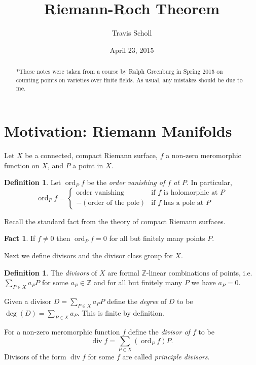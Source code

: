 \documentclass[11pt]{article}
\date{April 23, 2015}
\newcommand{\BB}[1]{\mathbb{#1}} %
\newcommand{\ZZ}{\BB{Z}}
\renewcommand{\div}{\operatorname{div}} %
\newcommand{\ord}{\operatorname{ord}}
\theoremstyle{plain}
\theoremstyle{definition}
\newtheorem{defn}[definitionCounter]{Definition}
\newtheorem{fact}[factCounter]{Fact}
\theoremstyle{remark}
\newcommand{\mytitle}{Riemann-Roch Theorem}
\newcommand{\myauthor}{Travis Scholl}
\begin{document}
\title{\bfseries\sffamily \mytitle}
\author{\sc \myauthor }
\maketitle

\begin{abstract}
	*These notes were taken from a course by Ralph Greenburg in Spring 2015 \cite{ralphscourse} on counting points on varieties over finite fields. As usual, any mistakes should be due to me.
\end{abstract}

\section{Motivation: Riemann Manifolds}
\hfill

Let $X$ be a connected, compact Riemann surface, $f$ a non-zero meromorphic function on $X$, and $P$ a point in $X$.

\begin{defn}
	Let $\ord_P f$ be the \emph{order vanishing of $f$ at $P$}. In particular,
	$$
	\ord_P f =
	\begin{cases}
		\text{order vanishing} &\text{if $f$ is holomorphic at $P$}
		\\
		-(\text{order of the pole}) &\text{if $f$ has a pole at $P$}
	\end{cases}
	$$
\end{defn}

Recall the standard fact from the theory of compact Riemann surfaces.

\begin{fact}\label{divffinitedegree}
	If $f\neq 0$ then $\ord_P f = 0$ for all but finitely many points $P$.
\end{fact}

Next we define divisors and the divisor class group for $X$.

\begin{defn}\label{divisors}
	The \emph{divisors} of $X$ are formal $\ZZ$-linear combinations of points, i.e. $\sum_{P\in X}a_P P$ for some $a_P\in\ZZ$ and for all but finitely many $P$ we have $a_P=0$.

	Given a divisor $D = \sum_{P\in X}a_P P$ define the \emph{degree} of $D$ to be $\deg(D) = \sum_{P\in X} a_P$. This is finite by definition.

	For a non-zero meromorphic function $f$ define the \emph{divisor of $f$} to be
	$$
	\div f = \sum_{P\in X} (\ord_P f)P.
	$$
	Divisors of the form $\div f$ for some $f$ are called \emph{principle divisors}.
\end{defn}
\end{document}
